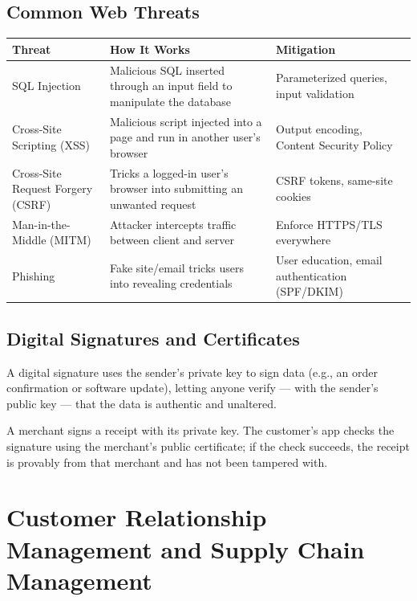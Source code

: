 \documentclass[11pt,a4paper]{article}
\begin{document}
\subsection{Common Web Threats}
\begin{center}
\begin{tabular}{@{}p{2.6cm}p{5.2cm}p{5.2cm}@{}}
\toprule
\rowcolor{primary!15}
\textbf{Threat} & \textbf{How It Works} & \textbf{Mitigation} \\
\midrule
SQL Injection & Malicious SQL inserted through an input field to manipulate the database & Parameterized queries, input validation \\
Cross-Site Scripting (XSS) & Malicious script injected into a page and run in another user's browser & Output encoding, Content Security Policy \\
Cross-Site Request Forgery (CSRF) & Tricks a logged-in user's browser into submitting an unwanted request & CSRF tokens, same-site cookies \\
Man-in-the-Middle (MITM) & Attacker intercepts traffic between client and server & Enforce HTTPS/TLS everywhere \\
Phishing & Fake site/email tricks users into revealing credentials & User education, email authentication (SPF/DKIM) \\
\bottomrule
\end{tabular}
\end{center}

\subsection{Digital Signatures and Certificates}
\begin{definitionbox}
A digital signature uses the sender's private key to sign data (e.g., an order confirmation or software update), letting anyone verify --- with the sender's public key --- that the data is authentic and unaltered.
\end{definitionbox}
\begin{examplebox}
A merchant signs a receipt with its private key. The customer's app checks the signature using the merchant's public certificate; if the check succeeds, the receipt is provably from that merchant and has not been tampered with.
\end{examplebox}

\section{Customer Relationship Management and Supply Chain Management}
\end{document}
